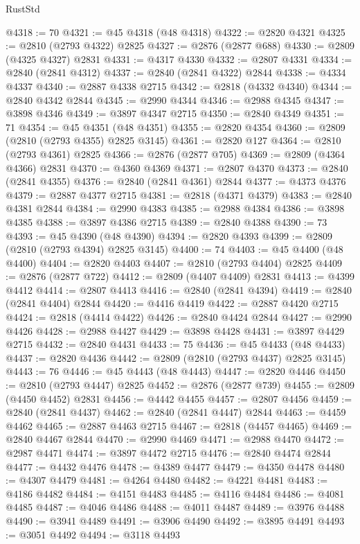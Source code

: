 \begin{lexlean}{RustStd}
\begin{coremodule}
@4318 := 70
@4321 := @45 @4318 (@48 @4318)
@4322 := @2820 @4321
@4325 := @2810 (@2793 @4322) @2825
@4327 := @2876 (@2877 @688)
@4330 := @2809 (@4325 @4327) @2831
@4331 := @4317 @4330
@4332 := @2807 @4331
@4334 := @2840 (@2841 @4312)
@4337 := @2840 (@2841 @4322) @2844
@4338 := @4334 @4337
@4340 := @2887 @4338 @2715
@4342 := @2818 (@4332 @4340)
@4344 := @2840 @4342 @2844
@4345 := @2990 @4344
@4346 := @2988 @4345
@4347 := @3898 @4346
@4349 := @3897 @4347 @2715
@4350 := @2840 @4349
@4351 := 71
@4354 := @45 @4351 (@48 @4351)
@4355 := @2820 @4354
@4360 := @2809 (@2810 (@2793 @4355) @2825 @3145)
@4361 := @2820 @127
@4364 := @2810 (@2793 @4361) @2825
@4366 := @2876 (@2877 @705)
@4369 := @2809 (@4364 @4366) @2831
@4370 := @4360 @4369
@4371 := @2807 @4370
@4373 := @2840 (@2841 @4355)
@4376 := @2840 (@2841 @4361) @2844
@4377 := @4373 @4376
@4379 := @2887 @4377 @2715
@4381 := @2818 (@4371 @4379)
@4383 := @2840 @4381 @2844
@4384 := @2990 @4383
@4385 := @2988 @4384
@4386 := @3898 @4385
@4388 := @3897 @4386 @2715
@4389 := @2840 @4388
@4390 := 73
@4393 := @45 @4390 (@48 @4390)
@4394 := @2820 @4393
@4399 := @2809 (@2810 (@2793 @4394) @2825 @3145)
@4400 := 74
@4403 := @45 @4400 (@48 @4400)
@4404 := @2820 @4403
@4407 := @2810 (@2793 @4404) @2825
@4409 := @2876 (@2877 @722)
@4412 := @2809 (@4407 @4409) @2831
@4413 := @4399 @4412
@4414 := @2807 @4413
@4416 := @2840 (@2841 @4394)
@4419 := @2840 (@2841 @4404) @2844
@4420 := @4416 @4419
@4422 := @2887 @4420 @2715
@4424 := @2818 (@4414 @4422)
@4426 := @2840 @4424 @2844
@4427 := @2990 @4426
@4428 := @2988 @4427
@4429 := @3898 @4428
@4431 := @3897 @4429 @2715
@4432 := @2840 @4431
@4433 := 75
@4436 := @45 @4433 (@48 @4433)
@4437 := @2820 @4436
@4442 := @2809 (@2810 (@2793 @4437) @2825 @3145)
@4443 := 76
@4446 := @45 @4443 (@48 @4443)
@4447 := @2820 @4446
@4450 := @2810 (@2793 @4447) @2825
@4452 := @2876 (@2877 @739)
@4455 := @2809 (@4450 @4452) @2831
@4456 := @4442 @4455
@4457 := @2807 @4456
@4459 := @2840 (@2841 @4437)
@4462 := @2840 (@2841 @4447) @2844
@4463 := @4459 @4462
@4465 := @2887 @4463 @2715
@4467 := @2818 (@4457 @4465)
@4469 := @2840 @4467 @2844
@4470 := @2990 @4469
@4471 := @2988 @4470
@4472 := @2987 @4471
@4474 := @3897 @4472 @2715
@4476 := @2840 @4474 @2844
@4477 := @4432 @4476
@4478 := @4389 @4477
@4479 := @4350 @4478
@4480 := @4307 @4479
@4481 := @4264 @4480
@4482 := @4221 @4481
@4483 := @4186 @4482
@4484 := @4151 @4483
@4485 := @4116 @4484
@4486 := @4081 @4485
@4487 := @4046 @4486
@4488 := @4011 @4487
@4489 := @3976 @4488
@4490 := @3941 @4489
@4491 := @3906 @4490
@4492 := @3895 @4491
@4493 := @3051 @4492
@4494 := @3118 @4493

\end{coremodule}
\end{lexlean}
